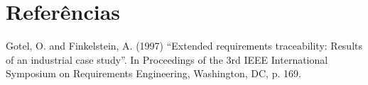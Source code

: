 
\chapter[Referências]{Referências}

Gotel, O. and Finkelstein, A. (1997) “Extended requirements traceability: Results of an industrial case study”. In Proceedings of the 3rd IEEE International Symposium on Requirements Engineering, Washington, DC, p. 169.\\
